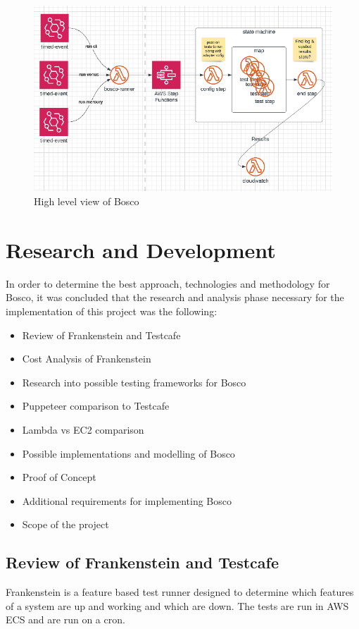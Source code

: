 \documentclass[12pt,a4paper,titlepage]{report}
\begin{document}
\begin{figure}[ht]
  \centering
  \includegraphics[width=\textwidth,height=\textheight,keepaspectratio]{./diagrams/bosco_high_level.png}
  \caption{High level view of Bosco}
\end{figure}

\chapter{Research and Development}

In order to determine the best approach, technologies and methodology for Bosco, it was concluded that the research and analysis phase necessary for the implementation of this project was the following:

\begin{itemize}
  \item Review of Frankenstein and Testcafe
  \item Cost Analysis of Frankenstein
  \item Research into possible testing frameworks for Bosco
  \item Puppeteer comparison to Testcafe
  \item Lambda vs EC2 comparison
  \item Possible implementations and modelling of Bosco
  \item Proof of Concept
  \item Additional requirements for implementing Bosco
  \item Scope of the project
\end{itemize}

\section{Review of Frankenstein and Testcafe}
Frankenstein is a feature based test runner designed to determine
which features of a system are up and working and which are down.
The tests are run in AWS ECS and are run on a cron.
\end{document}
